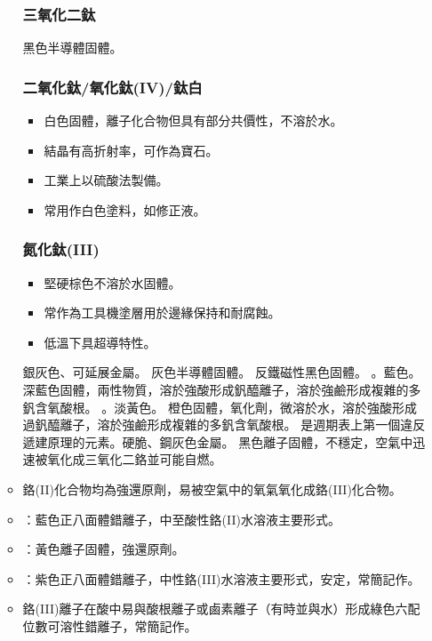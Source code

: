 \documentclass[a4paper,12pt]{report}
\begin{document}
\begin{itemize}
\begin{itemize}
\subsubsection{三氧化二鈦}
黑色半導體固體。
\subsubsection{二氧化鈦/氧化鈦(IV)/鈦白}
\begin{itemize}
\item 白色固體，離子化合物但具有部分共價性，不溶於水。
\item 結晶有高折射率，可作為寶石。
\item 工業上以硫酸法製備。
\item 常用作白色塗料，如修正液。
\end{itemize}
\subsubsection{氮化鈦(III)}
\begin{itemize}
\item 堅硬棕色不溶於水固體。
\item 常作為工具機塗層用於邊緣保持和耐腐蝕。
\item 低溫下具超導特性。
\end{itemize}
銀灰色、可延展金屬。
灰色半導體固體。
反鐵磁性黑色固體。
。藍色。
深藍色固體，兩性物質，溶於強酸形成釩醯離子，溶於強鹼形成複雜的多釩含氧酸根。
。淡黃色。
橙色固體，氧化劑，微溶於水，溶於強酸形成過釩醯離子，溶於強鹼形成複雜的多釩含氧酸根。
是週期表上第一個違反遞建原理的元素。硬脆、鋼灰色金屬。
黑色離子固體，不穩定，空氣中迅速被氧化成三氧化二鉻並可能自燃。
\bit
\item 鉻(II)化合物均為強還原劑，易被空氣中的氧氣氧化成鉻(III)化合物。
\item {}：藍色正八面體錯離子，中至酸性鉻(II)水溶液主要形式。
\item {}：黃色離子固體，強還原劑。
\eit
{}
\bit
\item {}：紫色正八面體錯離子，中性鉻(III)水溶液主要形式，安定，常簡記作。
\item 鉻(III)離子在酸中易與酸根離子或鹵素離子（有時並與水）形成綠色六配位數可溶性錯離子，常簡記作。

\end{itemize}
\end{itemize}
\end{document}

